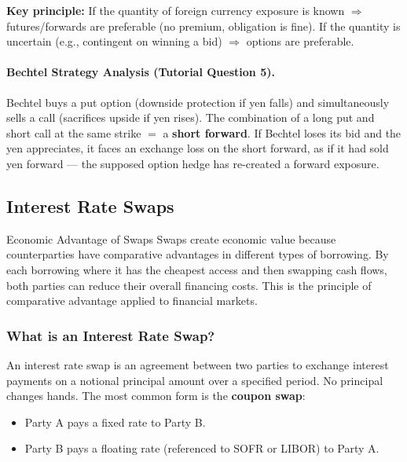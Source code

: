 \documentclass[11pt,a4paper]{article}
\begin{document}
\textbf{Key principle:} If the quantity of foreign currency exposure is known $\Rightarrow$ futures/forwards are preferable (no premium, obligation is fine). If the quantity is uncertain (e.g., contingent on winning a bid) $\Rightarrow$ options are preferable.

\paragraph{Bechtel Strategy Analysis (Tutorial Question 5).}

Bechtel buys a put option (downside protection if yen falls) and simultaneously sells a call (sacrifices upside if yen rises). The combination of a long put and short call at the same strike $=$ a \textbf{short forward}. If Bechtel loses its bid and the yen appreciates, it faces an exchange loss on the short forward, as if it had sold yen forward --- the supposed option hedge has re-created a forward exposure.

\subsection{Interest Rate Swaps}

\begin{conceptbox}{Economic Advantage of Swaps}
Swaps create economic value because counterparties have comparative advantages in different types of borrowing. By each borrowing where it has the cheapest access and then swapping cash flows, both parties can reduce their overall financing costs. This is the principle of comparative advantage applied to financial markets.
\end{conceptbox}

\subsubsection{What is an Interest Rate Swap?}

An interest rate swap is an agreement between two parties to exchange interest payments on a notional principal amount over a specified period. No principal changes hands. The most common form is the \textbf{coupon swap}:

\begin{itemize}
  \item Party A pays a fixed rate to Party B.
  \item Party B pays a floating rate (referenced to SOFR or LIBOR) to Party A.
\end{itemize}
\end{document}
